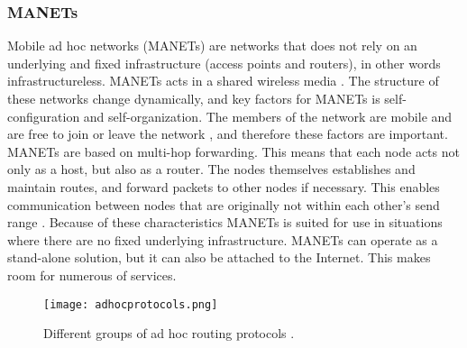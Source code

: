 \subsubsection{MANETs} Mobile ad hoc networks (MANETs) are networks that does not rely on an underlying and fixed infrastructure (access points and routers), in other words infrastructureless. MANETs acts in a shared wireless media \cite{adhoc}. The structure of these networks change dynamically, and key factors for MANETs is self-configuration and self-organization. The members of the network are mobile and are free to join or leave the network \cite{adhoc2}, and therefore these factors are important. MANETs are based on multi-hop forwarding. This means that each node acts not only as a host, but also as a router. The nodes themselves establishes and maintain routes, and forward packets to other nodes if necessary. This enables communication between nodes that are originally not within each other's send range \cite{adhoc2}. Because of these characteristics MANETs is suited for use in situations where there are no fixed underlying infrastructure. MANETs can operate as a stand-alone solution, but it can also be attached to the Internet. This makes room for numerous of services. 

\begin{figure}[h!]
  \centering
    \texttt{[image: adhocprotocols.png]}
     \caption{Different groups of ad hoc routing protocols \cite{adhoc}.}
\label{fig:adhocprotocols}
\end{figure}


